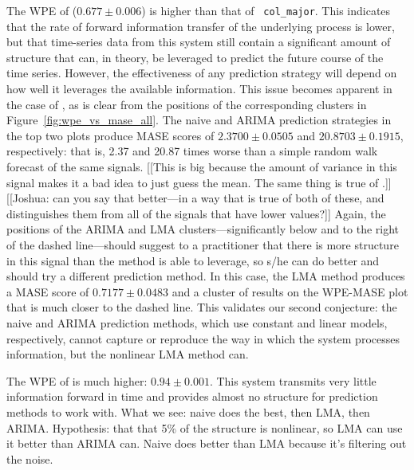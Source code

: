 The WPE of \svdfive ($0.677 \pm 0.006$) is higher than that of {\tt
  col\_major}.  This indicates that the rate of forward information
transfer of the underlying process is lower, but that time-series data
from this system still contain a significant amount of structure that
can, in theory, be leveraged to predict the future course of the time
series.  However, the effectiveness of any prediction strategy will
depend on how well it leverages the available information.
% 
% 
This issue becomes apparent in the case of \svdfive, as is clear from
the positions of the corresponding clusters in
Figure~\ref{fig:wpe_vs_mase_all}.  The naive and ARIMA prediction
strategies in the top two plots produce MASE scores of $2.3700 \pm
0.0505 $ and $20.8703 \pm 0.1915$, respectively: that is, 2.37 and
20.87 times worse than a simple random walk forecast of the same
signals.  [[This is big because the amount of variance in this signal
    makes it a bad idea to just guess the mean.  The same thing is
    true of \svdthree.]] [[Joshua: can you say that better---in a way
    that is true of both of these, and distinguishes them from all of
    the signals that have lower values?]] Again, the positions of the
ARIMA and LMA clusters---significantly below and to the right of the
dashed line---should suggest to a practitioner that there is more
structure in this signal than the method is able to leverage, so s/he
can do better and should try a different prediction method.  In this
case, the LMA method produces a MASE score of $ 0.7177\pm 0.0483 $ and
a cluster of results on the WPE-MASE plot that is much closer to the
dashed line.  This validates our second conjecture: the naive and
ARIMA prediction methods, which use constant and linear models,
respectively, cannot capture or reproduce the way in which the
\svdfive system processes information, but the nonlinear LMA method
can.

The WPE of \gcc is much higher: $0.94 \pm 0.001$.  This system
transmits very little information forward in time and provides almost
no structure for prediction methods to work with.  What we see: naive
does the best, then LMA, then ARIMA.  Hypothesis: that that 5\% of the
structure is nonlinear, so LMA can use it better than ARIMA can.
Naive does better than LMA because it's filtering out the noise.

